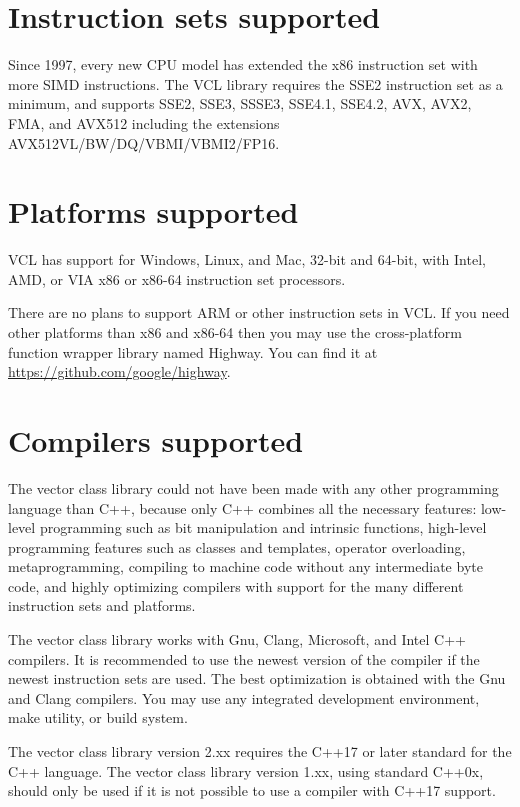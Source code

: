 \documentclass[vcl_manual.tex]{subfiles}
\begin{document}
\section{Instruction sets supported} \label{InstructionSetsSupported}
Since 1997, every new CPU model has extended the x86 instruction set with more SIMD instructions. The VCL library requires the SSE2 instruction set as a minimum, and supports SSE2, SSE3, SSSE3, SSE4.1, SSE4.2, AVX, AVX2, FMA, and AVX512 including the extensions AVX512VL/BW/DQ/VBMI/VBMI2/FP16.

\section{Platforms supported} \label{PlatformsSupported}
VCL has support for Windows, Linux, and Mac, 32-bit and 64-bit, with Intel, AMD, or VIA x86 or x86-64 instruction set processors. 

There are no plans to support ARM or other instruction sets in VCL. If you need other platforms than x86 and x86-64 then you may use the cross-platform function wrapper library named Highway. You can find it at \url{https://github.com/google/highway}.

\section{Compilers supported} \label{CompilersSupported}
The vector class library could not have been made with any other programming language than C++, because only C++ combines all the necessary features: low-level programming such as bit manipulation and intrinsic functions, high-level programming features such as classes and templates, operator overloading, metaprogramming, compiling to machine code without any intermediate byte code, and highly optimizing compilers with support for the many different instruction sets and platforms.

The vector class library works with Gnu, Clang, Microsoft, and Intel C++ compilers. It is recommended to use the newest version of the compiler if the newest instruction sets are used. The best optimization is obtained with the Gnu and Clang compilers.  You may use any integrated development environment, make utility, or build system.

The vector class library version 2.xx requires the C++17 or later standard for the C++ language. The vector class library version 1.xx, using standard C++0x, should only be used if it is not possible to use a compiler with C++17 support.
\end{document}
